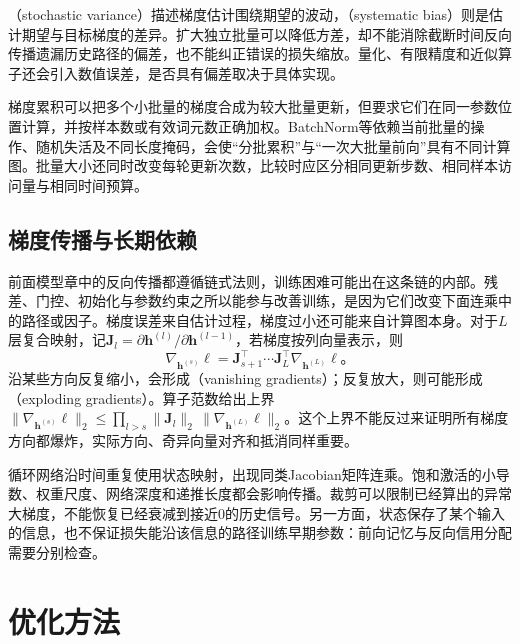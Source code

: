 （stochastic variance）描述梯度估计围绕期望的波动，（systematic bias）则是估计期望与目标梯度的差异。扩大独立批量可以降低方差，却不能消除截断时间反向传播遗漏历史路径的偏差，也不能纠正错误的损失缩放。量化、有限精度和近似算子还会引入数值误差，是否具有偏差取决于具体实现。

梯度累积可以把多个小批量的梯度合成为较大批量更新，但要求它们在同一参数位置计算，并按样本数或有效词元数正确加权。BatchNorm等依赖当前批量的操作、随机失活及不同长度掩码，会使“分批累积”与“一次大批量前向”具有不同计算图。批量大小还同时改变每轮更新次数，比较时应区分相同更新步数、相同样本访问量与相同时间预算。

\subsection{梯度传播与长期依赖}
\label{sec:training-gradient-propagation}

前面模型章中的反向传播都遵循链式法则，训练困难可能出在这条链的内部。残差、门控、初始化与参数约束之所以能参与改善训练，是因为它们改变下面连乘中的路径或因子。梯度误差来自估计过程，梯度过小还可能来自计算图本身。对于$L$层复合映射，记$\bm J_l=\partial\bm h^{(l)}/\partial\bm h^{(l-1)}$，若梯度按列向量表示，则
\begin{equation}
  \nabla_{\bm h^{(s)}}\ell
  =\bm J_{s+1}^{\top}\cdots\bm J_L^{\top}
    \nabla_{\bm h^{(L)}}\ell\text{。}
  \label{eq:training-jacobian-chain}
\end{equation}
沿某些方向反复缩小，会形成（vanishing gradients）；反复放大，则可能形成（exploding gradients）。算子范数给出上界$\lVert\nabla_{\bm h^{(s)}}\ell\rVert_2\leq\prod_{l>s}\lVert\bm J_l\rVert_2\,\lVert\nabla_{\bm h^{(L)}}\ell\rVert_2$。这个上界不能反过来证明所有梯度方向都爆炸，实际方向、奇异向量对齐和抵消同样重要。

循环网络沿时间重复使用状态映射，出现同类Jacobian矩阵连乘。饱和激活的小导数、权重尺度、网络深度和递推长度都会影响传播。裁剪可以限制已经算出的异常大梯度，不能恢复已经衰减到接近0的历史信号。另一方面，状态保存了某个输入的信息，也不保证损失能沿该信息的路径训练早期参数：前向记忆与反向信用分配需要分别检查。

\section{优化方法}
\label{sec:training-optimizers}

